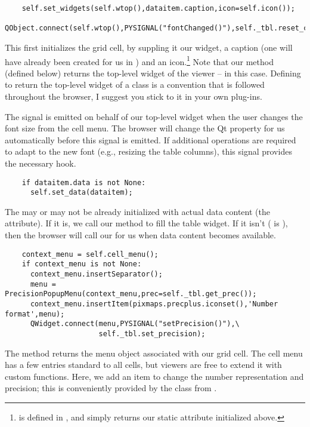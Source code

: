 \documentclass[12pt,twoside]{book}
\begin{document}
\begin{verbatim}  
    self.set_widgets(self.wtop(),dataitem.caption,icon=self.icon());
    QObject.connect(self.wtop(),PYSIGNAL("fontChanged()"),self._tbl.reset_colsizes);
\end{verbatim}

  This first initializes the grid cell, by suppling it our widget, a caption
  (one will have already been created for us in ) and an
  icon.\footnote{ is defined in , and simply
  returns our static  attribute initialized above.} Note that our
   method (defined below) returns the top-level widget of the
  viewer --  in this case. Defining  to return the
  top-level widget of a class is a convention that is followed throughout the
  browser, I suggest you stick to it in your own plug-ins.

  The  signal is emitted on behalf of our top-level widget
  when the user changes the font size from the cell menu. The browser will
  change the Qt  property for us automatically before this signal is
  emitted. If additional operations are required to adapt to the new font (e.g.,
  resizing the table columns), this signal provides the necessary hook.

\begin{verbatim}  
    if dataitem.data is not None:
      self.set_data(dataitem);
\end{verbatim}

  The  may or may not be already initialized with actual data
  content (the  attribute). If it is, we call our 
  method to fill the table widget. If it isn't ( is ), then
  the browser will call our  for us when data content becomes
  available.
        
\begin{verbatim}  
    context_menu = self.cell_menu();
    if context_menu is not None:
      context_menu.insertSeparator();
      menu = PrecisionPopupMenu(context_menu,prec=self._tbl.get_prec());
      context_menu.insertItem(pixmaps.precplus.iconset(),'Number format',menu);
      QWidget.connect(menu,PYSIGNAL("setPrecision()"),\
                      self._tbl.set_precision);
\end{verbatim}

  The  method returns the menu object associated with our grid
  cell. The cell menu has a few entries standard to all cells, but viewers are
  free to extend it with custom functions. Here, we add an item to change the
  number representation and precision; this is conveniently provided by the
  \qq{PrecisionPopupMenu} class from \qq{GUI/browsers.py}.
  
\end{document}
